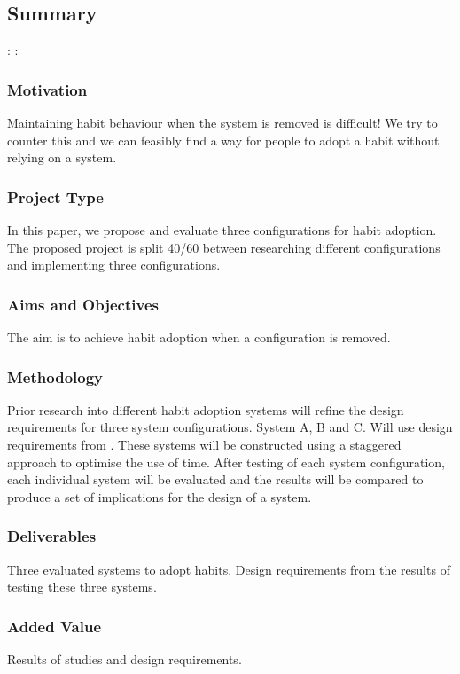 \subsection*{Summary}

:\newline
:

\subsubsection*{Motivation}
Maintaining habit behaviour when the system is removed is difficult! We try to counter this and we can feasibly find a way for people to adopt a habit without relying on a system.


\subsubsection*{Project Type}
In this paper, we propose and evaluate three configurations for habit adoption.
The proposed project is split 40/60 between researching different configurations and implementing three configurations.


\subsubsection*{Aims and Objectives}
The aim is to achieve habit adoption when a configuration is removed.


\subsubsection*{Methodology}
Prior research into different habit adoption systems will refine the design requirements for three system configurations. System A, B and C.\newline
Will use design requirements from \cite{article_dont_forget_your_pill}.
These systems will be constructed using a staggered approach to optimise the use of time.
After testing of each system configuration, each individual system will be evaluated and the results will be compared to produce a set of implications for the design of a system.


\subsubsection*{Deliverables}
Three evaluated systems to adopt habits. Design requirements from the results of testing these three systems.


\subsubsection*{Added Value}
Results of studies and design requirements.



